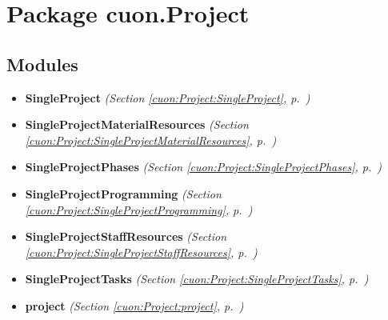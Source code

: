 %
%
%


\section{Package cuon.Project}

    \label{cuon:Project}


\subsection{Modules}

\begin{itemize}
\setlength{\parskip}{0ex}
\item \textbf{SingleProject}
  \textit{(Section \ref{cuon:Project:SingleProject}, p.~\pageref{cuon:Project:SingleProject})}

\item \textbf{SingleProjectMaterialResources}
  \textit{(Section \ref{cuon:Project:SingleProjectMaterialResources}, p.~\pageref{cuon:Project:SingleProjectMaterialResources})}

\item \textbf{SingleProjectPhases}
  \textit{(Section \ref{cuon:Project:SingleProjectPhases}, p.~\pageref{cuon:Project:SingleProjectPhases})}

\item \textbf{SingleProjectProgramming}
  \textit{(Section \ref{cuon:Project:SingleProjectProgramming}, p.~\pageref{cuon:Project:SingleProjectProgramming})}

\item \textbf{SingleProjectStaffResources}
  \textit{(Section \ref{cuon:Project:SingleProjectStaffResources}, p.~\pageref{cuon:Project:SingleProjectStaffResources})}

\item \textbf{SingleProjectTasks}
  \textit{(Section \ref{cuon:Project:SingleProjectTasks}, p.~\pageref{cuon:Project:SingleProjectTasks})}

\item \textbf{project}
  \textit{(Section \ref{cuon:Project:project}, p.~\pageref{cuon:Project:project})}

\end{itemize}


